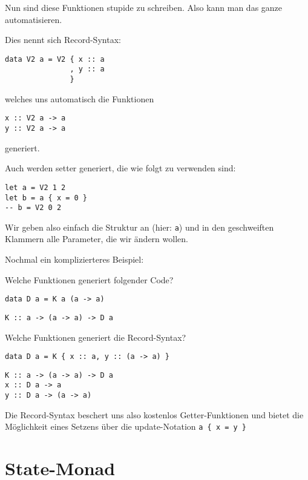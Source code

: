 \documentclass{beamer}
\begin{document}
\begin{frame}[fragile]
Nun sind diese Funktionen stupide zu schreiben. Also kann man das ganze automatisieren.\\\par
\pause
Dies nennt sich Record-Syntax:
\pause
\begin{verbatim}
data V2 a = V2 { x :: a
               , y :: a
               }
\end{verbatim}
\pause
welches uns automatisch die Funktionen
\begin{verbatim}
x :: V2 a -> a
y :: V2 a -> a
\end{verbatim}
generiert.
\end{frame}

\begin{frame}[fragile]
Auch werden setter generiert, die wie folgt zu verwenden sind:
\pause
\begin{verbatim}
let a = V2 1 2
let b = a { x = 0 }
-- b = V2 0 2
\end{verbatim}
\pause
Wir geben also einfach die Struktur an (hier: \texttt{a}) und in den geschweiften Klammern alle Parameter, die wir ändern wollen.
\end{frame}

\begin{frame}[fragile]
Nochmal ein komplizierteres Beispiel:\\\par
\pause
Welche Funktionen generiert folgender Code?
\begin{verbatim}
data D a = K a (a -> a)
\end{verbatim}
\pause
\begin{verbatim}
K :: a -> (a -> a) -> D a
\end{verbatim}
\pause
Welche Funktionen generiert die Record-Syntax?
\begin{verbatim}
data D a = K { x :: a, y :: (a -> a) }
\end{verbatim}
\pause
\begin{verbatim}
K :: a -> (a -> a) -> D a
x :: D a -> a
y :: D a -> (a -> a)
\end{verbatim}
\pause
Die Record-Syntax beschert uns also kostenlos Getter-Funktionen und bietet die Möglichkeit eines Setzens über die update-Notation \texttt{a \{ x = y \}}
\end{frame}


\section{State-Monad}
\end{document}
